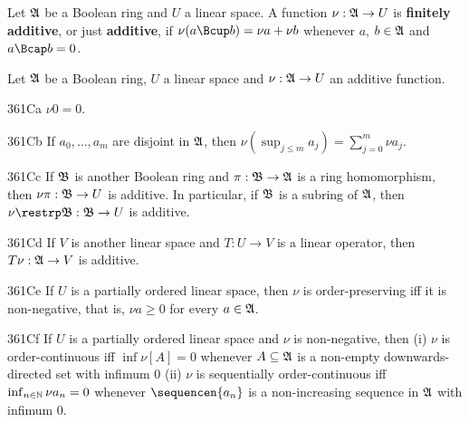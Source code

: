  Let $\frak A$ be a Boolean ring and $U$
a linear space.   A function $\nu:\frak A\to U$ is
{\bf finitely additive}, or just {\bf additive}, if
$\nu(a\Bcup b)=\nu a+\nu b$ whenever $a$, $b\in\frak A$ and
$a\Bcap b=0$.

   Let
$\frak A$ be a Boolean ring, $U$ a linear space and
$\nu:\frak A\to U$ an additive function.

\spheader 361Ca $\nu 0=0$.

\spheader 361Cb If $a_0,\ldots,a_m$ are disjoint in $\frak A$, then
$\nu(\sup_{j\le m}a_j)=\sum_{j=0}^m\nu a_j$.   

\spheader 361Cc If $\frak B$ is another Boolean ring and
$\pi:\frak B\to\frak A$ is a ring homomorphism, then
$\nu\pi:\frak B\to U$ is additive.   In particular, if $\frak B$ is a
subring of $\frak A$, then
$\nu\restrp\frak{B}:\frak B\to U$ is  additive.

\spheader 361Cd If $V$ is another linear space and $T:U\to V$ is a
linear operator, then $T\nu:\frak A\to V$ is additive.

\spheader 361Ce If $U$ is a partially ordered linear space, then $\nu$
is order-preserving iff it is non-negative, that is, $\nu a\ge 0$ for
every $a\in\frak A$.   %

\spheader 361Cf If $U$ is a partially ordered linear space and $\nu$ is
non-negative, then (i) $\nu$ is order-continuous iff $\inf\nu[A]=0$
whenever $A\subseteq\frak A$ is a non-empty downwards-directed set with
infimum $0$ (ii) $\nu$ is sequentially order-continuous iff
$\inf_{n\in\Bbb N}\nu a_n=0$ whenever $\sequencen{a_n}$ is a
non-increasing sequence in $\frak A$ with infimum $0$.

\medskip

